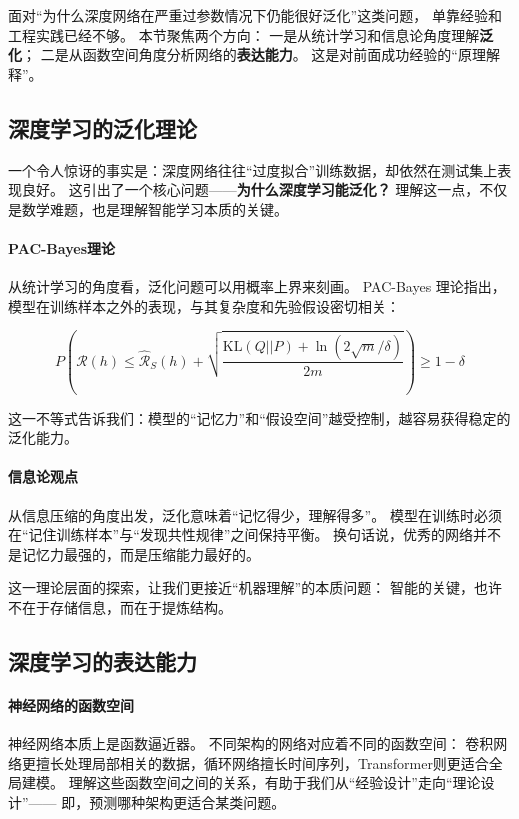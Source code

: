 面对“为什么深度网络在严重过参数情况下仍能很好泛化”这类问题，  
单靠经验和工程实践已经不够。  
本节聚焦两个方向：  
一是从统计学习和信息论角度理解\textbf{泛化}；  
二是从函数空间角度分析网络的\textbf{表达能力}。  
这是对前面成功经验的“原理解释”。

\subsection{深度学习的泛化理论}

一个令人惊讶的事实是：深度网络往往“过度拟合”训练数据，却依然在测试集上表现良好。  
这引出了一个核心问题——\textbf{为什么深度学习能泛化？}  
理解这一点，不仅是数学难题，也是理解智能学习本质的关键。

\paragraph{PAC-Bayes理论}  
从统计学习的角度看，泛化问题可以用概率上界来刻画。  
PAC-Bayes 理论指出，模型在训练样本之外的表现，与其复杂度和先验假设密切相关：

$$
P\left(\mathcal{R}(h) \leq \hat{\mathcal{R}}_S(h) + 
\sqrt{\frac{\text{KL}(Q||P) + \ln(2\sqrt{m}/\delta)}{2m}}
\right) \geq 1-\delta
$$

这一不等式告诉我们：模型的“记忆力”和“假设空间”越受控制，越容易获得稳定的泛化能力。

\paragraph{信息论观点}  
从信息压缩的角度出发，泛化意味着“记忆得少，理解得多”。  
模型在训练时必须在“记住训练样本”与“发现共性规律”之间保持平衡。  
换句话说，优秀的网络并不是记忆力最强的，而是压缩能力最好的。  

这一理论层面的探索，让我们更接近“机器理解”的本质问题：  
智能的关键，也许不在于存储信息，而在于提炼结构。

\subsection{深度学习的表达能力}

\paragraph{神经网络的函数空间}  
神经网络本质上是函数逼近器。  
不同架构的网络对应着不同的函数空间：  
卷积网络更擅长处理局部相关的数据，循环网络擅长时间序列，Transformer则更适合全局建模。  
理解这些函数空间之间的关系，有助于我们从“经验设计”走向“理论设计”——  
即，预测哪种架构更适合某类问题。


